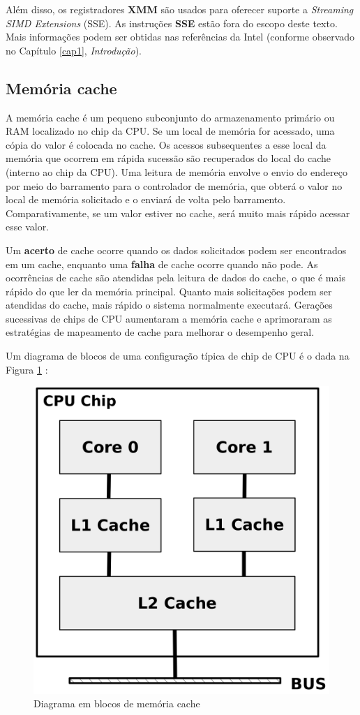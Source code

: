 Além disso, os registradores \textbf{XMM} são usados para oferecer suporte a \textit{Streaming SIMD Extensions} (SSE). As instruções \textbf{SSE} estão fora do escopo deste texto. Mais informações podem ser obtidas nas referências da Intel (conforme observado no Capítulo \ref{cap1}, \textit{Introdução}).

\subsection{Memória cache}
A memória cache é um pequeno subconjunto do armazenamento primário ou RAM localizado no chip da CPU. Se um local de memória for acessado, uma cópia do valor é colocada no cache. Os acessos subsequentes a esse local da memória que ocorrem em rápida sucessão são recuperados do local do cache (interno ao chip da CPU). Uma leitura de memória envolve o envio do endereço por meio do barramento para o controlador de memória, que obterá o valor no local de memória solicitado e o enviará de volta pelo barramento. Comparativamente, se um valor estiver no cache, será muito mais rápido acessar esse valor.

Um \textbf{acerto} de cache ocorre quando os dados solicitados podem ser encontrados em um cache, enquanto uma \textbf{falha} de cache ocorre quando não pode. As ocorrências de cache são atendidas pela leitura de dados do cache, o que é mais rápido do que ler da memória principal. Quanto mais solicitações podem ser atendidas do cache, mais rápido o sistema normalmente executará. Gerações sucessivas de chips de CPU aumentaram a memória cache e aprimoraram as estratégias de mapeamento de cache para melhorar o desempenho geral.

Um diagrama de blocos de uma configuração típica de chip de CPU é o dada na Figura \ref{fig:cache} :
\begin{figure}[ht]
\begin{center}
		\includegraphics[width=0.8\linewidth]{imagens/cache}
\end{center}
	\caption{Diagrama em blocos de memória cache}
	\label{fig:cache}
\end{figure}

